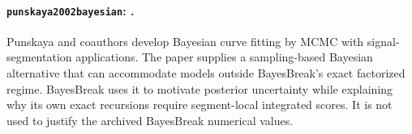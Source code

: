 
\paragraph{\texttt{punskaya2002bayesian}: \citet{punskaya2002bayesian}.}
Punskaya and coauthors develop Bayesian curve fitting by MCMC with signal-segmentation applications. The paper supplies a sampling-based Bayesian alternative that can accommodate models outside BayesBreak's exact factorized regime. BayesBreak uses it to motivate posterior uncertainty while explaining why its own exact recursions require segment-local integrated scores. It is not used to justify the archived BayesBreak numerical values.
